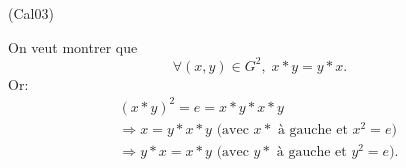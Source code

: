\begin{tiny}(Cal03)\end{tiny} On veut montrer que
\[
 \forall (x,y)\in G^2, \; x * y = y *x.
\]
Or:
\begin{multline*}
 (x*y)^2 = e = x * y * x * y \\
 \Rightarrow x = y * x * y \text{ (avec } x * \text{ à gauche et $x^2=e$) } \\
 \Rightarrow y * x =  x * y \text{ (avec } y * \text{ à gauche et $y^2 = e$).}
\end{multline*}
